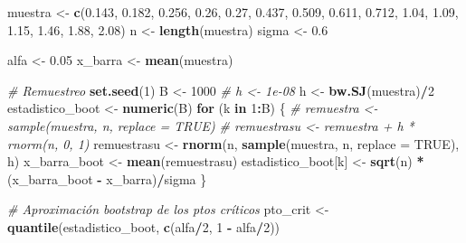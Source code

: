 \documentclass[]{book}
\newenvironment{Shaded}{\begin{snugshade}}{\end{snugshade}}
\newcommand{\KeywordTok}[1]{\textcolor[rgb]{0.13,0.29,0.53}{\textbf{#1}}}
\newcommand{\DataTypeTok}[1]{\textcolor[rgb]{0.13,0.29,0.53}{#1}}
\newcommand{\DecValTok}[1]{\textcolor[rgb]{0.00,0.00,0.81}{#1}}
\newcommand{\FloatTok}[1]{\textcolor[rgb]{0.00,0.00,0.81}{#1}}
\newcommand{\StringTok}[1]{\textcolor[rgb]{0.31,0.60,0.02}{#1}}
\newcommand{\CommentTok}[1]{\textcolor[rgb]{0.56,0.35,0.01}{\textit{#1}}}
\newcommand{\OtherTok}[1]{\textcolor[rgb]{0.56,0.35,0.01}{#1}}
\newcommand{\ControlFlowTok}[1]{\textcolor[rgb]{0.13,0.29,0.53}{\textbf{#1}}}
\newcommand{\OperatorTok}[1]{\textcolor[rgb]{0.81,0.36,0.00}{\textbf{#1}}}
\newcommand{\NormalTok}[1]{#1}
\theoremstyle{definition}
\theoremstyle{definition}
\theoremstyle{definition}
\theoremstyle{remark}
\begin{document}
\begin{Shaded}
\begin{Highlighting}[]
\NormalTok{muestra <-}\StringTok{ }\KeywordTok{c}\NormalTok{(}\FloatTok{0.143}\NormalTok{, }\FloatTok{0.182}\NormalTok{, }\FloatTok{0.256}\NormalTok{, }\FloatTok{0.26}\NormalTok{, }\FloatTok{0.27}\NormalTok{, }\FloatTok{0.437}\NormalTok{, }\FloatTok{0.509}\NormalTok{, }
             \FloatTok{0.611}\NormalTok{, }\FloatTok{0.712}\NormalTok{, }\FloatTok{1.04}\NormalTok{, }\FloatTok{1.09}\NormalTok{, }\FloatTok{1.15}\NormalTok{, }\FloatTok{1.46}\NormalTok{, }\FloatTok{1.88}\NormalTok{, }\FloatTok{2.08}\NormalTok{)}
\NormalTok{n <-}\StringTok{ }\KeywordTok{length}\NormalTok{(muestra)}
\NormalTok{sigma <-}\StringTok{ }\FloatTok{0.6}

\NormalTok{alfa <-}\StringTok{ }\FloatTok{0.05}
\NormalTok{x_barra <-}\StringTok{ }\KeywordTok{mean}\NormalTok{(muestra)}

\CommentTok{# Remuestreo}
\KeywordTok{set.seed}\NormalTok{(}\DecValTok{1}\NormalTok{)}
\NormalTok{B <-}\StringTok{ }\DecValTok{1000}
\CommentTok{# h <- 1e-08}
\NormalTok{h <-}\StringTok{ }\KeywordTok{bw.SJ}\NormalTok{(muestra)}\OperatorTok{/}\DecValTok{2}
\NormalTok{estadistico_boot <-}\StringTok{ }\KeywordTok{numeric}\NormalTok{(B)}
\ControlFlowTok{for}\NormalTok{ (k }\ControlFlowTok{in} \DecValTok{1}\OperatorTok{:}\NormalTok{B) \{}
    \CommentTok{# remuestra <- sample(muestra, n, replace = TRUE)}
    \CommentTok{# remuestrasu <- remuestra + h * rnorm(n, 0, 1)}
\NormalTok{    remuestrasu <-}\StringTok{ }\KeywordTok{rnorm}\NormalTok{(n, }\KeywordTok{sample}\NormalTok{(muestra, n, }\DataTypeTok{replace =} \OtherTok{TRUE}\NormalTok{), h)}
\NormalTok{    x_barra_boot <-}\StringTok{ }\KeywordTok{mean}\NormalTok{(remuestrasu)}
\NormalTok{    estadistico_boot[k] <-}\StringTok{ }\KeywordTok{sqrt}\NormalTok{(n) }\OperatorTok{*}\StringTok{ }\NormalTok{(x_barra_boot }\OperatorTok{-}\StringTok{ }\NormalTok{x_barra)}\OperatorTok{/}\NormalTok{sigma}
\NormalTok{\}}

\CommentTok{# Aproximación bootstrap de los ptos críticos}
\NormalTok{pto_crit <-}\StringTok{ }\KeywordTok{quantile}\NormalTok{(estadistico_boot, }\KeywordTok{c}\NormalTok{(alfa}\OperatorTok{/}\DecValTok{2}\NormalTok{, }\DecValTok{1} \OperatorTok{-}\StringTok{ }\NormalTok{alfa}\OperatorTok{/}\DecValTok{2}\NormalTok{))}


\end{Highlighting}
\end{Shaded}
\end{document}
